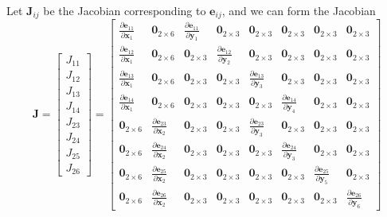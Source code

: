 \documentclass{article}
\theoremstyle{definition}
\theoremstyle{remark}
\theoremstyle{definition}
\begin{document}
Let $\mathbf{J}_{ij}$ be the Jacobian corresponding to $\mathbf{e}_{ij}$, and we can form the Jacobian 
\[\mathbf{J} = \begin{bmatrix} J_{11} \\ J_{12} \\ J_{13} \\ J_{14} \\ J_{23} \\ J_{24} \\ J_{25} \\ J_{26} \end{bmatrix} = \begin{bmatrix} 
\frac{\partial \mathbf{e}_{11}}{\partial \mathbf{x}_1} & \mathbf{0}_{2 \times 6} & \frac{\partial \mathbf{e}_{11}}{\partial \mathbf{y}_1} & \mathbf{0}_{2 \times 3} & \mathbf{0}_{2 \times 3} & \mathbf{0}_{2 \times 3} & \mathbf{0}_{2 \times 3} & \mathbf{0}_{2 \times 3} \\ 
\frac{\partial \mathbf{e}_{12}}{\partial \mathbf{x}_1} & \mathbf{0}_{2 \times 6} & \mathbf{0}_{2 \times 3} & \frac{\partial \mathbf{e}_{12}}{\partial \mathbf{y}_2} & \mathbf{0}_{2 \times 3} & \mathbf{0}_{2 \times 3} & \mathbf{0}_{2 \times 3} & \mathbf{0}_{2 \times 3} \\ 
\frac{\partial \mathbf{e}_{13}}{\partial \mathbf{x}_1} & \mathbf{0}_{2 \times 6} & \mathbf{0}_{2 \times 3} & \mathbf{0}_{2 \times 3} & \frac{\partial \mathbf{e}_{13}}{\partial \mathbf{y}_3} & \mathbf{0}_{2 \times 3} & \mathbf{0}_{2 \times 3} & \mathbf{0}_{2 \times 3} \\ 
\frac{\partial \mathbf{e}_{14}}{\partial \mathbf{x}_1} & \mathbf{0}_{2 \times 6} & \mathbf{0}_{2 \times 3} & \mathbf{0}_{2 \times 3} & \mathbf{0}_{2 \times 3} & \frac{\partial \mathbf{e}_{14}}{\partial \mathbf{y}_4} & \mathbf{0}_{2 \times 3} & \mathbf{0}_{2 \times 3} \\

\mathbf{0}_{2 \times 6} & \frac{\partial \mathbf{e}_{23}}{\partial \mathbf{x}_2}  & \mathbf{0}_{2 \times 3} & \mathbf{0}_{2 \times 3} & \frac{\partial \mathbf{e}_{23}}{\partial \mathbf{y}_3} & \mathbf{0}_{2 \times 3} & \mathbf{0}_{2 \times 3} & \mathbf{0}_{2 \times 3} \\

\mathbf{0}_{2 \times 6} & \frac{\partial \mathbf{e}_{24}}{\partial \mathbf{x}_2}  & \mathbf{0}_{2 \times 3} & \mathbf{0}_{2 \times 3} & \mathbf{0}_{2 \times 3} & \frac{\partial \mathbf{e}_{24}}{\partial \mathbf{y}_3} & \mathbf{0}_{2 \times 3} & \mathbf{0}_{2 \times 3} \\

\mathbf{0}_{2 \times 6} & \frac{\partial \mathbf{e}_{25}}{\partial \mathbf{x}_2} & \mathbf{0}_{2 \times 3} & \mathbf{0}_{2 \times 3} & \mathbf{0}_{2 \times 3} & \mathbf{0}_{2 \times 3} & \frac{\partial \mathbf{e}_{25}}{\partial \mathbf{y}_5} &  \mathbf{0}_{2 \times 3} \\

\mathbf{0}_{2 \times 6} & \frac{\partial \mathbf{e}_{26}}{\partial \mathbf{x}_2}  & \mathbf{0}_{2 \times 3} & \mathbf{0}_{2 \times 3} & \mathbf{0}_{2 \times 3} & \mathbf{0}_{2 \times 3} & \mathbf{0}_{2 \times 3} & \frac{\partial \mathbf{e}_{26}}{\partial \mathbf{y}_6}
\end{bmatrix}\]
\end{document}
